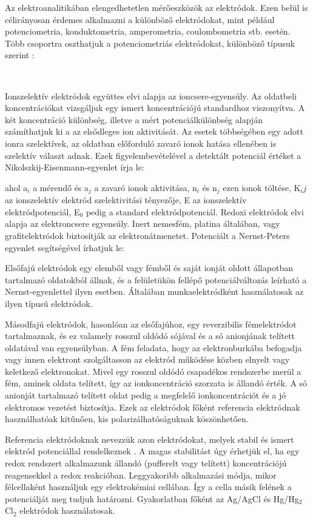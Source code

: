 Az elektroanalitikában elengedhetetlen mérőeszközök az elektródok. Ezen belül is célirányosan érdemes alkalmazni a különböző elektródokat, mint például potenciometria, konduktometria, amperometria, coulombometria stb. esetén.
Több csoportra oszthatjuk a potenciometriás elektródokat, különböző típusuk szerint \cite{kalman2002az}:
\begin{lstlisting}  
   
\end{lstlisting}
Ionszelektív elektródok együttes elvi alapja az ioncsere-egyensúly. Az oldatbeli koncentrációkat vizsgáljuk egy ismert koncentrációjú standardhoz viszonyítva. A két koncentráció különbség, illetve a mért potenciálkülönbség alapján számíthatjuk ki a az elsődleges ion aktivitását. Az esetek többségében egy adott ionra szelektívek, az oldatban előforduló zavaró ionok hatása ellenében is szelektív választ adnak. Ezek figyelembevételével a detektált potenciál értéket a Nikolszkij-Eisenmann-egyenlet írja le:

ahol a$_i$  a mérendő és a$_j$ a zavaró ionok aktivitása, n$_i$ és n$_j$ ezen ionok töltése, K$_ij$ az ionszelektív elektród szelektivitási tényezője, E az ionszelektív elektródpotenciál, E$_0$ pedig a standard elektródpotenciál.
Redoxi elektródok elvi alapja az elektroncsere egyensúly. Inert nemesfém, platina általában, vagy grafitelektródok biztosítják az elektronátmenetet. Potenciált a Nernst-Peters egyenlet segítségével írhatjuk le:

Elsőfajú elektródok egy elemből vagy fémből és saját ionját oldott állapotban tartalmazó oldatokból állnak, és a felületükön fellépő potenciálváltozás leírható a Nernst-egyenlettel ilyen esetben. Általában munkaelektródként használatosak az ilyen típusú elektródok.

Másodfajú elektródok, hasonlóan az elsőfajúhoz, egy reverzibilis fémelektródot tartalmaznak, és ez valamely rosszul oldódó sójával és a só anionjának telített oldatával van egyensúlyban. A fém feladata, hogy az elektronburkába befogadja vagy innen elektront szolgáltasson az elektród működése közben elnyelt vagy keletkező elektronokat. Mivel egy rosszul oldódó csapadékos rendszerbe merül a fém, aminek oldata telített, így az ionkoncentráció szorzata is állandó érték. A só anionját tartalmazó telített oldat pedig a megfelelő ionkoncentrációt és a jó elektromos vezetést biztosítja. Ezek az elektródok főként referencia elektródnak használhatóak kitűnően, kis polarizálhatóságuknak köszönhetően.

Referencia elektródoknak nevezzük azon elektródokat, melyek stabil és ismert elektród potenciállal rendelkeznek \cite{allen2001electrochemical}. A magas stabilitást úgy érhetjük el, ha egy redox rendszert alkalmazunk állandó (pufferelt vagy telített) koncentrációjú reagensekkel a redox reakcióban. Leggyakoribb alkalmazási módja, mikor félcellaként használjuk egy elektrokémiai cellában. Így a cella másik felének a potenciálját meg tudjuk határozni. Gyakorlatban főként az Ag/AgCl és Hg/Hg$_2$Cl$_2$ elektródok használatosak. 

